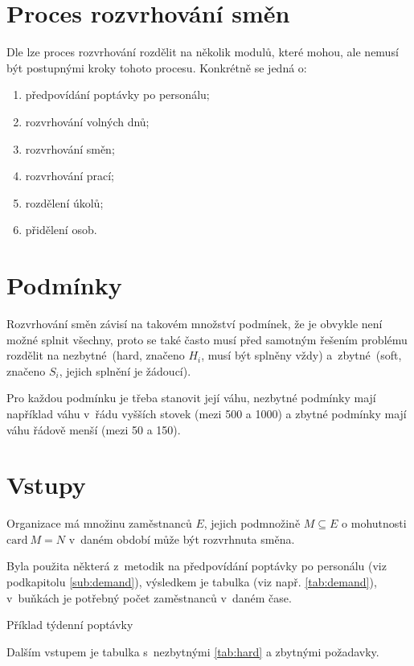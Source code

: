 \documentclass[twoside]{ctuthesis}
\begin{document}
\section{Proces rozvrhování směn}
Dle \cite{ernst2004staff} lze proces rozvrhování rozdělit na několik modulů, které mohou, ale nemusí být postupnými kroky tohoto procesu. Konkrétně se jedná o:
\begin{enumerate}
	\item předpovídání poptávky po personálu;
	\item rozvrhování volných dnů;
	\item rozvrhování směn;
	\item rozvrhování prací;
	\item rozdělení úkolů;
	\item přidělení osob.
\end{enumerate}

\section{Podmínky}
Rozvrhování směn závisí na takovém množství podmínek, že je obvykle není možné splnit všechny, proto se také často musí před samotným řešením problému rozdělit na nezbytné~(hard, značeno $H_i$, musí být splněny vždy) a~zbytné~(soft, značeno $S_i$, jejich splnění je žádoucí). \cite{todorovic2012bee}

Pro každou podmínku je třeba stanovit její váhu, nezbytné podmínky mají například váhu v~řádu vyšších stovek (mezi 500 a 1000) a zbytné podmínky mají váhu řádově menší (mezi 50 a 150). \cite{buyukozkan2014applicability}


\section{Vstupy}
Organizace má množinu zaměstnanců $E$, jejich podmnožině $M \subseteq E$ o mohutnosti $\mbox{card}~M = N$ v~daném období může být rozvrhnuta směna.

Byla použita některá z~metodik na předpovídání poptávky po personálu (viz podkapitolu \ref{sub:demand}), výsledkem je tabulka (viz např. \ref{tab:demand}), v~buňkách je potřebný počet zaměstnanců v~daném čase.

\begin{table}[h]
	
	\caption{Příklad týdenní poptávky}
	\label{tab:demand}
\end{table}

Dalším vstupem je tabulka s~nezbytnými \ref{tab:hard} a zbytnými požadavky.
\end{document}
